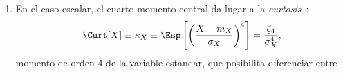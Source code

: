 \begin{itemize}
\begin{enumerate}
\item  En  el caso  escalar,  el  cuarto momento  central  da  lugar  a la  {\it
    curtosis}~\cite{Pea05, Wes14}:
  \[
  \Curt[X]  \equiv \kappa_X  \equiv \Esp\left[  \left( \frac{X  - m_X}{\sigma_X}
    \right)^4 \right] = \frac{\zeta_4}{\sigma_X^4},
  \]
  momento de orden  4 de la variable estandar,  que posibilita diferenciar entre

\end{enumerate}
\end{itemize}
